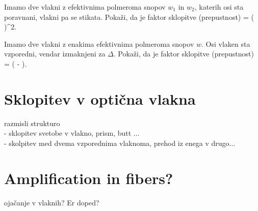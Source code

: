 \begin{definition}
Imamo dve vlakni z efektivnima polmeroma snopov $w_1$ in $w_2$, katerih 
osi sta poravnani, vlakni pa se stikata. Pokaži, da je faktor sklopitve (prepustnost)
\beq
\eta = \left( \right)^2.
\eeq
\end{definition}

\begin{definition}
Imamo dve vlakni z enakima efektivnima polmeroma snopov $w$. Osi vlaken 
sta vzporedni, vendar izmaknjeni za $\Delta$. Pokaži, da je faktor sklopitve (prepustnost)
\beq
\eta = \exp \left( - \right).
\eeq
\end{definition}

\section{Sklopitev v optična vlakna}
razmisli strukturo \\
- sklopitev svetobe v vlakno, prism, butt ...\\
- skolpitev med dvema vzporednima vlaknoma, prehod iz enega v drugo...


\section{Amplification in fibers?}
ojačanje v vlaknih? Er doped? 


